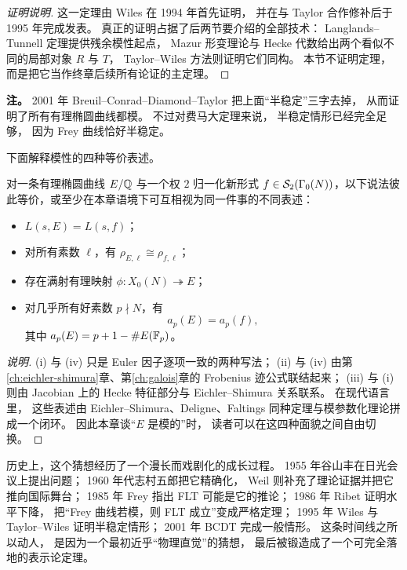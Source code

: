 \begin{proof}[证明说明]
这一定理由 Wiles 在 1994 年首先证明，
并在与 Taylor 合作修补后于 1995 年完成发表。
真正的证明占据了后两节要介绍的全部技术：
Langlands--Tunnell 定理提供残余模性起点，
Mazur 形变理论与 Hecke 代数给出两个看似不同的局部对象 $R$ 与 $T$，
Taylor--Wiles 方法则证明它们同构。
本节不证明定理，
而是把它当作终章后续所有论证的主定理。
\end{proof}

\textbf{注。}
2001 年 Breuil--Conrad--Diamond--Taylor 把上面“半稳定”三字去掉，
从而证明了所有有理椭圆曲线都模。
不过对费马大定理来说，
半稳定情形已经完全足够，
因为 Frey 曲线恰好半稳定。

下面解释模性的四种等价表述。

\begin{proposition}[模性的四种面貌]
\label{prop:ch10-modularity-equivalent}
对一条有理椭圆曲线 $E/\mathbb{Q}$ 与一个权 $2$ 归一化新形式 $f\in \mathcal{S}_2(\Gamma_0(N))$，以下说法彼此等价，或至少在本章语境下可互相视为同一件事的不同表述：
\begin{itemize}
  \item[(i)] $L(s,E)=L(s,f)$；
  \item[(ii)] 对所有素数 $\ell$，有 $\rho_{E,\ell}\cong \rho_{f,\ell}$；
  \item[(iii)] 存在满射有理映射 $\phi\colon X_0(N)\twoheadrightarrow E$；
  \item[(iv)] 对几乎所有好素数 $p\nmid N$，有
  \[
    a_p(E)=a_p(f),
  \]
  其中 $a_p(E)=p+1-\#E(\mathbb{F}_p)$。
\end{itemize}
\end{proposition}

\begin{proof}[说明]
(i) 与 (iv) 只是 Euler 因子逐项一致的两种写法；
(ii) 与 (iv) 由第\ref{ch:eichler-shimura}章、第\ref{ch:galois}章的 Frobenius 迹公式联结起来；
(iii) 与 (i) 则由 Jacobian 上的 Hecke 特征部分与 Eichler--Shimura 关系联系。
在现代语言里，
这些表述由 Eichler--Shimura、Deligne、Faltings 同种定理与模参数化理论拼成一个闭环。
因此本章谈“$E$ 是模的”时，
读者可以在这四种面貌之间自由切换。
\end{proof}

历史上，这个猜想经历了一个漫长而戏剧化的成长过程。
1955 年谷山丰在日光会议上提出问题；
1960 年代志村五郎把它精确化，
Weil 则补充了理论证据并把它推向国际舞台；
1985 年 Frey 指出 FLT 可能是它的推论；
1986 年 Ribet 证明水平下降，
把“Frey 曲线若模，则 FLT 成立”变成严格定理；
1995 年 Wiles 与 Taylor--Wiles 证明半稳定情形；
2001 年 BCDT 完成一般情形。
这条时间线之所以动人，
是因为一个最初近乎“物理直觉”的猜想，
最后被锻造成了一个可完全落地的表示论定理。

